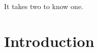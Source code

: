 
\begin{savequote}[8cm]

  It takes two to know one.


\end{savequote}









\chapter{\label{introduction}Introduction}



\minitoc





